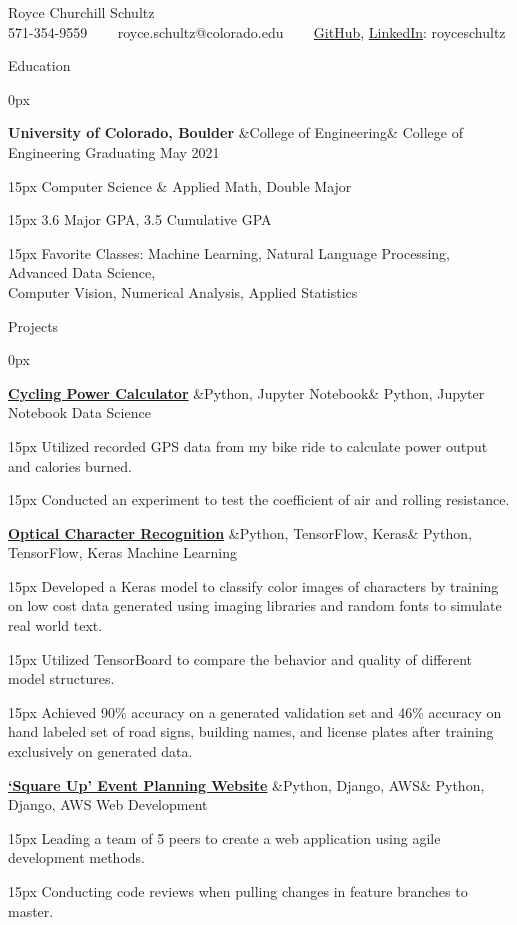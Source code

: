 \documentclass{article}
\newcommand{\horizontalBreaker}{\ \ \ }
\newcommand{\sectionIndent}{15px}
\newcommand{\sectionHeader}[1]{
    \vspace{4px}
    \sffamily \color{primary} \Large
    #1
    \color{black}
    \rmfamily
    \hrulefill
    \vspace{3px}
}
\newcommand{\itemHeader}[3]{
    \vspace{6px}
    \Large \textbf{#1}
    \normalsize
    \ifx&#3&
    \else
        \vspace{2px}
        \sffamily \color{light}
        #3
        \rmfamily \color{black}
    \fi
    \color{primary}
    \hfill \sffamily#2 \rmfamily
    \color{black}

}
\newcommand{\itemContent}[1]{
    \vspace{4px} \normalsize
    \begin{addmargin}{\sectionIndent}
        #1
        \vspace{1px}
    \end{addmargin}
}
\begin{document}
\begin{center}
    {\Huge \sffamily Royce Churchill Schultz \rmfamily}\\
        \vspace{6px}
    {\normalsize
        571-354-9559 \horizontalBreaker
        royce.schultz@colorado.edu \horizontalBreaker
        \href{https://www.github.com/royceschultz}{GitHub}, \href{https://linkedin.com/in/royceschultz}{LinkedIn}: royceschultz
    }
\end{center}

\sectionHeader{Education}
    \begin{addmargin}[\sectionIndent]{0px}
        \itemHeader
            {University of Colorado, Boulder}
            {Graduating May 2021}
            {College of Engineering}
        \itemContent{Computer Science \& Applied Math, Double Major}
        \itemContent{3.6 Major GPA, 3.5 Cumulative GPA}
        \itemContent{Favorite Classes: Machine Learning, Natural Language Processing, Advanced Data Science,\\Computer Vision, Numerical Analysis, Applied Statistics}
    \end{addmargin}
\sectionHeader{Projects}
    \begin{addmargin}[\sectionIndent]{0px}
        \itemHeader
            {\href{https://github.com/royceschultz/Cycling-Power-Calculator}{Cycling Power Calculator}}
            {Data Science}
            {Python, Jupyter Notebook}
        \itemContent{Utilized recorded GPS data from my bike ride to calculate power output and calories burned.}
        \itemContent{Conducted an experiment to test the coefficient of air and rolling resistance.}

        \itemHeader
            {\href{https://github.com/royceschultz/Optical-Character-Recognition}{Optical Character Recognition}}
            {Machine Learning}
            {Python, TensorFlow, Keras}
        \itemContent{Developed a Keras model to classify color images of characters by training on low cost data generated using imaging libraries and random fonts to simulate real world text.}
        \itemContent{Utilized TensorBoard to compare the behavior and quality of different model structures.}
        \itemContent{Achieved 90\% accuracy on a generated validation set and 46\% accuracy on hand labeled set of road signs, building names, and license plates after training exclusively on generated data.}

        \itemHeader
            {\href{https://github.com/royceschultz/Purple-Nut-Project}{`Square Up' Event Planning Website}}
            {Web Development}
            {Python, Django, AWS}
        \itemContent{Leading a team of 5 peers to create a web application using agile development methods.}
        \itemContent{Conducting code reviews when pulling changes in feature branches to master.}


    \end{addmargin}
\end{document}
